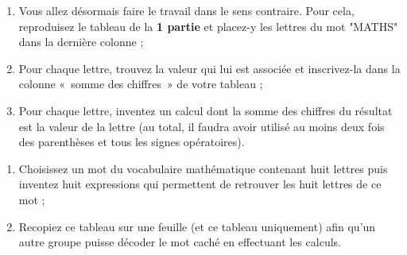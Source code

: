 \begin{TP}

\begin{enumerate}
 \item Vous allez désormais faire le travail dans le sens contraire. Pour cela, reproduisez le tableau de la \textbf{1 partie} et placez-y les lettres du mot "MATHS" dans la dernière colonne ;
 \item Pour chaque lettre, trouvez la valeur qui lui est associée et inscrivez-la dans la colonne « somme des chiffres » de votre tableau ;
 \item Pour chaque lettre, inventez un calcul dont la somme des chiffres du résultat est la valeur de la lettre (au total, il faudra avoir utilisé au moins deux fois des parenthèses et tous les signes opératoires).
\end{enumerate}



\begin{enumerate}
 \item Choisissez un mot du vocabulaire mathématique contenant huit lettres puis inventez huit expressions qui permettent de retrouver les huit lettres de ce mot ;
 \item Recopiez ce tableau sur une feuille (et ce tableau uniquement) afin qu'un autre groupe puisse décoder le mot caché en effectuant les calculs.
 
 \end{enumerate}

\end{TP}




